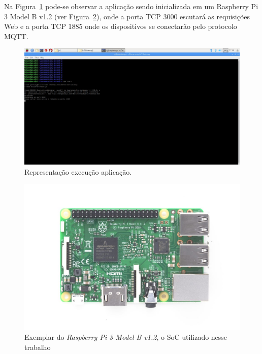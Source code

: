 Na Figura~\ref{fig:raspberryDistroRaspbian} pode-se observar a aplicação sendo inicializada em um Raspberry Pi 3 Model B v1.2 (ver Figura~\ref{fig:raspberryPi3ModelB}), onde a porta TCP 3000 escutará as requisições Web e a porta TCP 1885 onde os dispositivos se conectarão pelo protocolo MQTT.
\begin{figure}[h!]
	\begin{center}
		\includegraphics[width=1.085\textwidth]{./img/raspberryDistroRaspbian}
		\caption{Representação execução aplicação.}
		\label{fig:raspberryDistroRaspbian}
	\end{center}
\end{figure}

\begin{figure}[h!]
	\begin{center}
		\includegraphics[width=1.085\textwidth]{./img/raspberry-pi-3}
		\caption{Exemplar do \textit{Raspberry Pi 3 Model B v1.2}, o SoC utilizado nesse trabalho}
		\label{fig:raspberryPi3ModelB}
	\end{center}
\end{figure}

